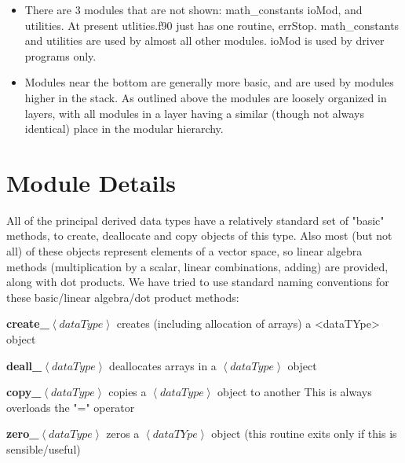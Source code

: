 \documentclass[12pt]{article}
\begin{document}
\begin{itemize}
\item
There are 3 modules that are not shown: math\_constants
ioMod, and utilities.  At present utlities.f90 just has one routine,
errStop.  math\_constants and utilities
are used by almost all other modules.  ioMod is used by driver
programs only.

\item
Modules near the bottom are generally more basic, and
are used by modules higher in the stack.  As outlined above
the modules are loosely organized in layers, with all modules
in a layer having a similar (though not always identical)
place in the modular hierarchy.
\end{itemize}

\section{Module Details}

All of the principal derived data types have a relatively
standard set of "basic" methods, to create, deallocate and copy
objects of this type.  Also most (but not all) of these
objects represent elements of a vector space, so
linear algebra methods (multiplication by a scalar,
linear combinations, adding) are provided, along with dot
products.  We have tried to use standard naming conventions
for these basic/linear algebra/dot product methods: 

\vspace{10pt}

\noindent
{\bf create\_}$\left< dataType \right>$ creates (including allocation of
                arrays) a <dataTYpe> object

\vspace{10pt}

\noindent
{\bf deall\_}$\left< dataType \right>$ deallocates 
arrays in a $\left< dataType \right>$ object

\vspace{10pt}

\noindent
{\bf copy\_}$\left< dataType \right>$ copies 
a $\left< dataType \right>$ object to another
This is always overloads the "=" operator

\vspace{10pt}

\noindent
{\bf zero\_}$\left< dataType \right>$ zeros 
a $\left< dataTYpe \right>$ object (this routine
exits only if this is sensible/useful)

\vspace{10pt}
\end{document}
